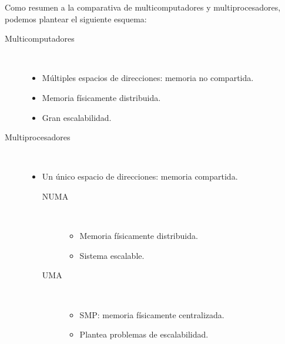 Como resumen a la comparativa de multicomputadores y multiprocesadores, podemos plantear el siguiente esquema:
\begin{description}
    \item [Multicomputadores]\ 
        \begin{itemize}
            \item Múltiples espacios de direcciones: memoria no compartida.
            \item Memoria físicamente distribuida.
            \item Gran escalabilidad.
        \end{itemize}
    \item [Multiprocesadores]\ 
        \begin{itemize}
            \item Un único espacio de direcciones: memoria compartida.
            \begin{description}
                \item [NUMA]\ 
                    \begin{itemize}
                        \item Memoria físicamente distribuida.
                        \item Sistema escalable.
                    \end{itemize}

                \item [UMA]\ 
                    \begin{itemize}
                        \item SMP: memoria físicamente centralizada.
                        \item Plantea problemas de escalabilidad.
                    \end{itemize}
            \end{description}
        \end{itemize}
\end{description}

